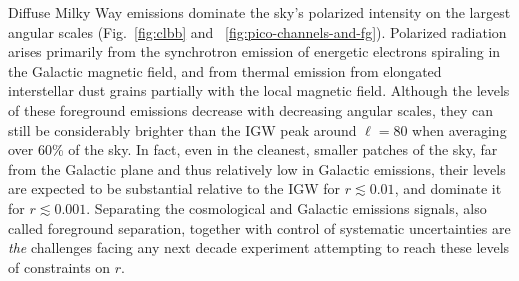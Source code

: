 \documentclass[PICOReport.tex]{subfiles}
\begin{document}

Diffuse Milky Way emissions dominate the sky's polarized intensity on the largest angular scales (Fig.~\ref{fig:clbb} and ~\ref{fig:pico-channels-and-fg}).  Polarized radiation arises primarily from the synchrotron emission of energetic electrons spiraling in the Galactic magnetic field, and from thermal
emission from elongated interstellar dust grains partially with the local magnetic field. Although the levels of these foreground emissions decrease with decreasing angular scales, they can still be considerably brighter 
than the \ac{IGW} peak around $\ell=80$ when averaging over 60\% of the sky. 
In fact, even in the cleanest, smaller patches of the sky, far from the Galactic plane and thus relatively low in Galactic emissions, their levels are expected to be substantial relative to the \ac{IGW} for $r \lesssim 0.01$, and dominate it for $r \lesssim0.001$. Separating the cosmological and Galactic emissions signals, also called foreground separation, together with control of systematic uncertainties are {\it the} challenges facing any next decade experiment attempting to reach these levels of constraints on $r$.
\end{document}

